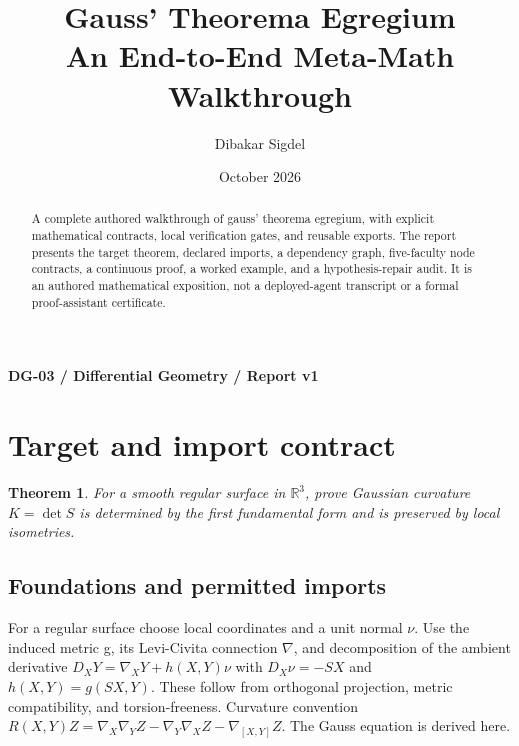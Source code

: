 \documentclass[preprint,12pt,aps,pra,showkeys,amsmath,amssymb,superscriptaddress,floatfix]{revtex4-2}
\newtheorem{theorem}{Theorem}[section]
\theoremstyle{definition}
\theoremstyle{remark}
\begin{document}
\title{Gauss' Theorema Egregium\\[4pt]\large An End-to-End Meta-Math Walkthrough}

\author{Dibakar Sigdel}


\date{October 2026}

\begin{abstract}

A complete authored walkthrough of gauss' theorema egregium, with
explicit mathematical contracts, local verification gates, and reusable
exports. The report presents the target theorem, declared imports, a
dependency graph, five-faculty node contracts, a continuous proof, a
worked example, and a hypothesis-repair audit. It is an authored
mathematical exposition, not a deployed-agent transcript or a formal
proof-assistant certificate.

\end{abstract}\maketitle\linespread{1.12}\selectfont

\noindent\textbf{DG-03 / Differential Geometry / Report v1}

\section{Target and import contract}

\begin{theorem}

For a smooth regular surface in \(\mathbb R^3\), prove Gaussian
curvature \(K=\det S\) is determined by the first fundamental form and
is preserved by local isometries.

\end{theorem}

\subsection{Foundations and permitted imports}

For a regular surface choose local coordinates and a unit normal
\(\nu\). Use the induced metric g, its Levi-Civita connection
\(\nabla\), and decomposition of the ambient derivative
\(D_XY=\nabla _XY+h(X,Y)\nu\) with \(D_X\nu =-SX\) and
\(h(X,Y)=g(SX,Y)\). These follow from orthogonal projection, metric
compatibility, and torsion-freeness. Curvature convention
\(R(X,Y)Z=\nabla _X\nabla _YZ-\nabla _Y\nabla _XZ-\nabla _[X,Y]Z\). The
Gauss equation is derived here.
\end{document}
